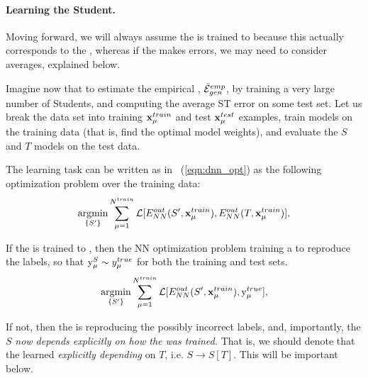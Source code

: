 \paragraph{Learning the Student.}
Moving forward, we will always assume the \Teacher is trained to \Interpolation because this
actually corresponds to the \AnnealedApproximation, whereas if the \Teacher makes
errors, we may need to consider \Quenched averages, explained below.  

Imagine now that to estimate the empirical \AverageGeneralizationError, $\bar{\mathcal{E}}^{emp}_{gen}$,
by training a very large number of Students, and computing the average ST error on some test set.
Let us break the data set into training $\mathbf{x}_{\mu}^{train}$ and test $\mathbf{x}_{\mu}^{test}$ examples, 
train models on the training data (that is, find the optimal model weights), 
and evaluate the $S$ and $T$ models on the test data.

The \Student learning task can be written as in \EQN~(\ref{eqn:dnn_opt})
as the following optimization problem over the training data:
\begin{align}
\underset{\{S'\}}{\text{argmin}}\sum_{\mu=1}^{N^{train}}\mathcal{L}[E^{out}_{NN}(S',\mathbf{x}_{\mu}^{train}),E^{out}_{NN}(T,\mathbf{x}_{\mu}^{train})]   ,
\label{eqn:ST-learning-task}
\end{align}

If the \Teacher is trained to \Interpolation, then the NN optimization problem 
training a \Student to reproduce the \GroundTruth labels, so that $\mathrm{y}_{\mu}^{S}\sim y_{\mu}^{true}$
for both the training and test sets.
\begin{align}
\underset{\{S'\}}{\text{argmin}}\sum_{\mu=1}^{N^{train}}\mathcal{L}[E^{out}_{NN}(S',\mathbf{x}_{\mu}^{train}),\mathrm{y}_{\mu}^{true}]   ,
\label{eqn:ST-learning-intepolation}
\end{align}

If not, then the \Student is reproducing the possibly
incorrect \Teacher labels, and, importantly, the \Student $S$ \emph{now depends explicitly
on how the \Teacher was trained.}    That is, we should denote that the learned
\Student \emph{explicitly depending} on $T$, i.e. $S\rightarrow S[T]$.
This will be important below.


